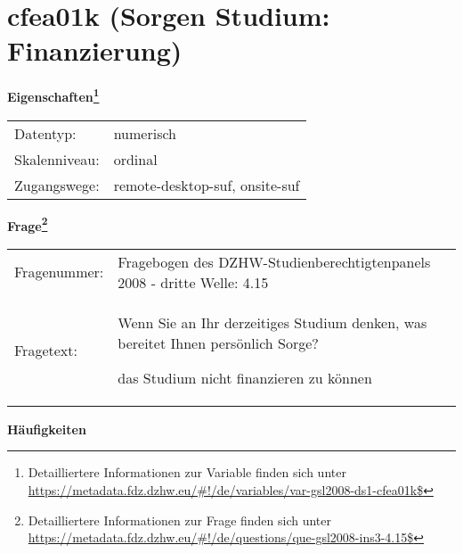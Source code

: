 
    \setcounter{footnote}{0}

    \vspace*{-1.8cm}
	\section{cfea01k (Sorgen Studium: Finanzierung)}
	\label{section:cfea01k}



    \vspace*{0.5cm}
    \noindent\textbf{Eigenschaften\footnote{Detailliertere Informationen zur Variable finden sich unter
		\url{https://metadata.fdz.dzhw.eu/\#!/de/variables/var-gsl2008-ds1-cfea01k$}}}\\
	\begin{tabularx}{\hsize}{@{}lX}
	Datentyp: & numerisch \\
	Skalenniveau: & ordinal \\
	Zugangswege: &
	  remote-desktop-suf, 
	  onsite-suf
 \\
    \end{tabularx}



				\vspace*{0.5cm}
                \noindent\textbf{Frage\footnote{Detailliertere Informationen zur Frage finden sich unter
		              \url{https://metadata.fdz.dzhw.eu/\#!/de/questions/que-gsl2008-ins3-4.15$}}}\\
				\begin{tabularx}{\hsize}{@{}lX}
					Fragenummer: &
					  Fragebogen des DZHW-Studienberechtigtenpanels 2008 - dritte Welle:
					  4.15
 \\
					Fragetext: & Wenn Sie an Ihr derzeitiges Studium denken, was bereitet Ihnen persönlich Sorge?\par  das Studium nicht finanzieren zu können \\
				\end{tabularx}





        		\vspace*{0.5cm}
                \noindent\textbf{Häufigkeiten}

